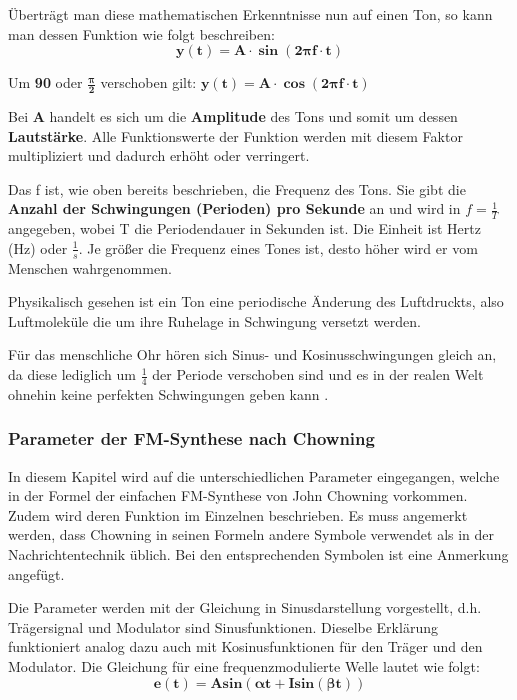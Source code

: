 Überträgt man diese mathematischen Erkenntnisse nun auf einen Ton, so kann man dessen Funktion wie folgt beschreiben: 		\begin{equation}\bm{y(t) = A \cdot \sin(2 \pi f \cdot t)}\end{equation}

Um \textbf{90\degree} oder $\bm{\frac{\pi}{2}}$ verschoben gilt: 		$\bm{y(t) = A\cdot \cos(2 \pi f\cdot t)}$

Bei $\bm{A}$ handelt es sich um die \textbf{Amplitude} des Tons und somit um dessen \textbf{Lautstärke}. Alle Funktionswerte der Funktion werden mit diesem Faktor multipliziert und dadurch erhöht oder verringert.

Das f ist, wie oben bereits beschrieben, die Frequenz des Tons. Sie gibt die \textbf{Anzahl der Schwingungen (Perioden) pro Sekunde} an und wird in $f=\frac{1}{T}$ angegeben, wobei T die Periodendauer in Sekunden ist. Die Einheit ist Hertz (Hz) oder $\frac{1}{s}$.
Je größer die Frequenz eines Tones ist, desto höher wird er vom Menschen wahrgenommen.

Physikalisch gesehen ist ein Ton eine periodische Änderung des Luftdruckts, also Luftmoleküle die um ihre Ruhelage in Schwingung versetzt werden\cite[s. 111 f.]{zwicker}. 

Für das menschliche Ohr hören sich Sinus- und Kosinusschwingungen gleich an, da diese lediglich um $\frac{1}{4}$ der Periode verschoben sind und es in der realen Welt ohnehin keine perfekten Schwingungen geben kann \cite[s. 3f.]{zwicker}. 
\subsubsection{Parameter der FM-Synthese nach Chowning}
\label{chowningparameter}

In diesem Kapitel wird auf die unterschiedlichen Parameter eingegangen, welche in der Formel der einfachen FM-Synthese von John Chowning vorkommen. Zudem wird deren Funktion im Einzelnen beschrieben. Es muss angemerkt werden, dass Chowning in seinen Formeln andere Symbole verwendet als in der Nachrichtentechnik üblich. Bei den entsprechenden Symbolen ist eine Anmerkung angefügt.

Die Parameter werden mit der Gleichung in Sinusdarstellung vorgestellt, d.h. Trägersignal und Modulator sind Sinusfunktionen. Dieselbe Erklärung funktioniert analog dazu auch mit Kosinusfunktionen für den Träger und den Modulator.
Die Gleichung für eine frequenzmodulierte Welle lautet wie folgt:
\begin{equation} \bm{e(t) = A sin(\alpha t + I sin(\beta t))} \end{equation}

